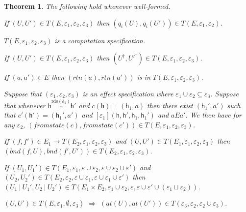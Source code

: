\documentclass[nocopyrightspace,preprint]{sigplanconf}
\newcommand{\rdsin}[1]{\mathrm{rds}({#1})}
\newcommand{\semparallel}{~|~}
\newcommand{\eff}{\varepsilon}
\newtheorem{theorem}{Theorem}[section]
\newcommand\heap{\ensuremath{\mathsf{h}}\xspace}
\newcommand\h{\heap}
\newcommand\rloc[3]{\ensuremath{#1 \stackrel{#3}{\sim} #2}}
\begin{document}
\begin{theorem}\label{main}
The following hold whenever well-formed. 
\begin{compactenum}
\item\label{eins} If $(U,U')\in T(E,\eff_1,\eff_2,\eff_3)$ then $(q_i(U),q_i(U'))\in T(E,\eff_1,\eff_2)$. 
\item\label{einsa} $T(E,\eff_1,\eff_2,\eff_3)$ is a computation specification. 
\item\label{zwei} If $(U,U')\in T(E,\eff_1,\eff_2,\eff_3)$ then $(U^\dagger,{U'}^\dagger)\in T(E,\eff_1,\eff_2,\eff_3)$. 
\item\label{drei} If $(a,a')\in E$ then $(\textit{rtn}(a),\textit{rtn}(a'))$ is in $T(E,\eff_1,\eff_2,\eff_3)$. 
\item\label{vier} Suppose that $(\eff_1,\eff_2,\eff_3)$ is an effect specification where $\eff_1\cup\eff_2\subseteq \eff_3$. Suppose that whenever $\rloc{\h}{\h'}{\rdsin{\eff_1}}$ and $c(\h)=(\h_1,a)$ then there exist $(\h_1',a')$ such that $c'(\h')=(\h_1',a')$ and $[\eff_1](\h,\h',\h_1,\h_1')$ and $aEa'$. We then have  for any $\eff_2$,  $(\textit{fromstate}(c),\textit{fromstate}(c'))\in T(E,\eff_1,\eff_2,\eff_3)$. 
\item\label{fuenf} If 
 $(f,f')\in E_1{\rightarrow} T(E_2,\eff_1,\eff_2,\eff_3)$ and $(U,U')\in T(E_1,\eff_1,\eff_2,\eff_3)$ then $(\textit{bnd}(f,U),\textit{bnd}(f',U'))\in T(E_2,\eff_1,\eff_2,\eff_3)$. 
\item\label{sechs} If $(U_1,U_1')\in T(E_1,\eff_1,\eff\cup\eff_2,\eff\cup\eff_2\cup\eff')$ and $(U_2,U_2')\in T(E_2,\eff_2,\eff\cup\eff_1,\eff\cup\eff_1\cup\eff')$ then $(U_1\semparallel U_1',U_2\semparallel U_2')\in 
T(E_1\times E_2,\eff_1\cup\eff_2,\eff,\eff\cup\eff'\cup(\eff_1\sqcup\eff_2))$.
\item\label{acht} $(U,U')\in T(E,\eff_1,\emptyset,\eff_3)$ $\Rightarrow$ 
$(\textit{at}(U), \textit{at}(U'))\in T(\eff_3,\eff_2,\eff_2\cup\eff_3)$.  
\end{compactenum}
\end{theorem}
\end{document}
